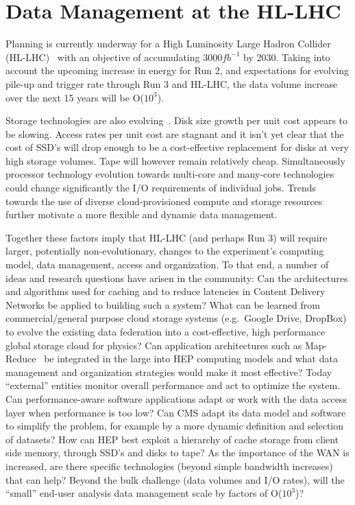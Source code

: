 \documentclass[a4paper]{jpconf}
\begin{document}
\section{Data Management at the HL-LHC}
Planning is currently underway for a High Luminosity Large Hadron
Collider (HL-LHC)~\cite{HLLHC} with an objective of accumulating
${3000fb^{-1}}$ by 2030. Taking into account the upcoming increase
in energy for Run 2, and expectations for evolving pile-up and
trigger rate through Run 3 and HL-LHC, the data volume increase
over the next 15 years will be O($10^3$).

Storage technologies are also evolving~\cite{SMSTORAGE}.  Disk size
growth per unit cost appears to be slowing. Access rates per unit
cost are stagnant and it isn't yet clear that the cost of SSD's
will drop enough to be a cost-effective replacement for disks at
very high storage volumes. Tape will however remain relatively
cheap. Simultaneously processor technology evolution towards
multi-core and many-core technologies~\cite{SMPROC} could change
significantly the I/O requirements of individual jobs. Trends towards
the use of diverse cloud-provisioned compute and storage
resources~\cite{SMEFCOMP} further motivate a more flexible and
dynamic data management.

Together these factors imply that HL-LHC (and perhaps Run 3) will
require larger, potentially non-evolutionary, changes to the
experiment's computing model, data management, access and organization.
To that end, a number of ideas and research questions have arisen
in the community: Can the architectures and algorithms used for
caching and to reduce latencies in Content Delivery Networks be
applied to building such a system?  What can be learned from
commercial/general purpose cloud storage systems (e.g.\ Google
Drive, DropBox) to evolve the existing data federation into a
cost-effective, high performance global storage cloud for physics?
Can application architectures such as Map-Reduce~\cite{MAPREDUCE}
be integrated in the large into HEP computing models and what data
management and organization strategies would make it most effective?
Today ``external'' entities monitor overall performance and act to
optimize the system. Can performance-aware software applications
adapt or work with the data access layer when performance is too
low? Can CMS adapt its data model and software to simplify the
problem, for example by a more dynamic definition and selection of
datasets? How can HEP best exploit a hierarchy of cache storage
from client side memory, through SSD's and disks to tape?  As the
importance of the WAN is increased, are there specific technologies
(beyond simple bandwidth increases) that can help?  Beyond the bulk
challenge (data volumes and I/O rates), will the ``small'' end-user
analysis data management scale by factors of O($10^3$)?
\end{document}
